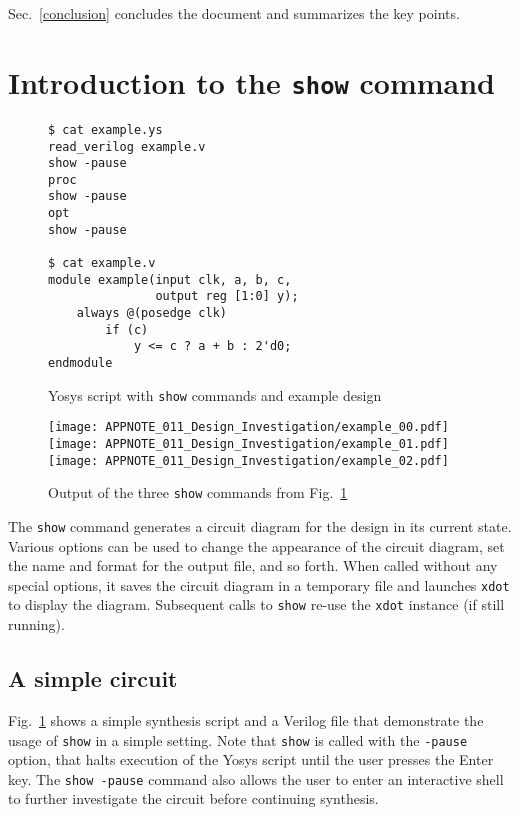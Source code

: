 \documentclass[9pt,technote,a4paper]{IEEEtran}
\begin{document}
Sec.~\ref{conclusion} concludes the document and summarizes the key points.

\section{Introduction to the {\tt show} command}
\label{intro_show}

\begin{figure}[b]
\begin{lstlisting}
$ cat example.ys
read_verilog example.v
show -pause
proc
show -pause
opt
show -pause

$ cat example.v
module example(input clk, a, b, c,
               output reg [1:0] y);
    always @(posedge clk)
        if (c)
            y <= c ? a + b : 2'd0;
endmodule
\end{lstlisting}
\caption{Yosys script with {\tt show} commands and example design}
\label{example_src}
\end{figure}

\begin{figure}[b!]
\texttt{[image: APPNOTE\_011\_Design\_Investigation/example\_00.pdf]}
\texttt{[image: APPNOTE\_011\_Design\_Investigation/example\_01.pdf]}
\texttt{[image: APPNOTE\_011\_Design\_Investigation/example\_02.pdf]}
\caption{Output of the three {\tt show} commands from Fig.~\ref{example_src}}
\label{example_out}
\end{figure}

The {\tt show} command generates a circuit diagram for the design in its
current state. Various options can be used to change the appearance of the
circuit diagram, set the name and format for the output file, and so forth.
When called without any special options, it saves the circuit diagram in
a temporary file and launches {\tt xdot} to display the diagram.
Subsequent calls to {\tt show} re-use the {\tt xdot} instance
(if still running).

\subsection{A simple circuit}

Fig.~\ref{example_src} shows a simple synthesis script and a Verilog file that
demonstrate the usage of {\tt show} in a simple setting. Note that {\tt show}
is called with the {\tt -pause} option, that halts execution of the Yosys
script until the user presses the Enter key. The {\tt show -pause} command
also allows the user to enter an interactive shell to further investigate the
circuit before continuing synthesis.
\end{document}

